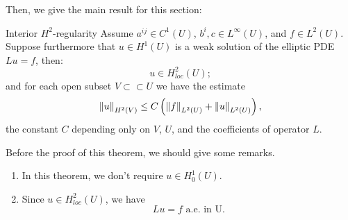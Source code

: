 Then, we give the main result for this section:
\begin{theorem}{Interior $H^{2}$-regularity}
    \label{thm:interior_regularity}
    Assume $a^{ij}\in C^{1}(U)$, $b^{i},c\in L^{\infty}(U)$, and $f\in L^{2}(U)$. Suppose furthermore that $u\in H^{1}(U)$ is a weak solution of the elliptic PDE $Lu=f$, then:
    \begin{equation}
        u\in H_{loc}^{2}(U);
    \end{equation}
    and for each open subset $V\subset\subset U$ we have the estimate 
    \begin{equation}
        \label{eq:estimate_H2_u}
        \left\|u\right\|_{H^{2}(V)}\le C\left(\left\|f\right\|_{L^{2}(U)}+\left\|u\right\|_{L^{2}(U)}\right),
    \end{equation}
    the constant $C$ depending only on $V$, $U$, and the coefficients of operator $L
    $.
\end{theorem}
Before the proof of this theorem, we should give some remarks.

\begin{remark}
    \begin{enumerate}
        \item In this theorem, we don't require $u\in H_{0}^{1}(U)$.
        \item Since $u\in H_{loc}^{2}(U)$, we have
        \begin{equation}
            Lu=f\text{ a.e. in U}.
        \end{equation}
    \end{enumerate}
\end{remark}

